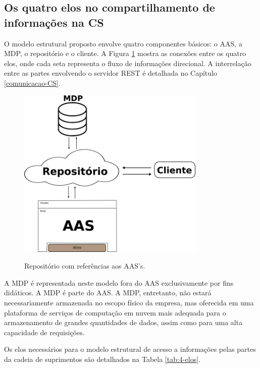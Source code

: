 \documentclass[
	12pt,				%
	oneside,			%
	a4paper,			%
	english,			%
	brazil				%
]{abntex2}
\begin{document}
	
	\subsection{Os quatro elos no compartilhamento de informações na CS}
	
	O modelo estrutural proposto envolve quatro componentes básicos: o AAS, a MDP, o repositório e o cliente. A Figura \ref{fig:4-elos} mostra as conexões entre os quatro elos, onde cada seta representa o fluxo de informações direcional. A interrelação entre as partes envolvendo o servidor REST é detalhada no Capítulo \ref{comunicacao-CS}.
	
	\begin{figure}[H]
		\centering
		\caption{Repositório com referências aos AAS's.}
		\includegraphics[width=0.8\textwidth]{4-elos.png}
		\label{fig:4-elos}
	\end{figure}
	
	A MDP é representada neste modelo fora do AAS exclusivamente por fins didáticos. A MDP é parte do AAS. A MDP, entretanto, não estará necessariamente armazenada no escopo físico da empresa, mas oferecida em uma plataforma de serviços de computação em nuvem mais adequada para o armazenamento de grandes quantidades de dados, assim como para uma alta capacidade de requisições.
	
	Os elos necessários para o modelo estrutural de acesso a informações pelas partes da cadeia de suprimentos são detalhados na Tabela \ref{tab:4-elos}.
	
\end{document}
